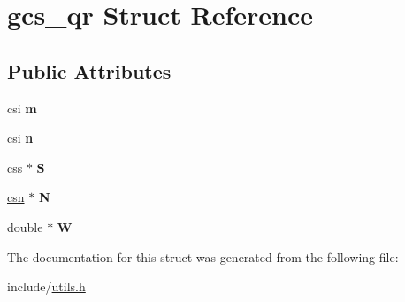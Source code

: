 \hypertarget{structgcs__qr}{\section{gcs\+\_\+qr Struct Reference}
\label{structgcs__qr}
}
\subsection*{Public Attributes}
\begin{DoxyCompactItemize}
\item 
\hypertarget{structgcs__qr_a0194509e3965e3c8d9653a9d801db79e}{csi {\bfseries m}}\label{structgcs__qr_a0194509e3965e3c8d9653a9d801db79e}

\item 
\hypertarget{structgcs__qr_a66b1d8d00721ed2760f8e69656ac1cbb}{csi {\bfseries n}}\label{structgcs__qr_a66b1d8d00721ed2760f8e69656ac1cbb}

\item 
\hypertarget{structgcs__qr_adb0fc2f2a9e0904ded44aa2e2510af18}{\hyperlink{structcs__symbolic}{css} $\ast$ {\bfseries S}}\label{structgcs__qr_adb0fc2f2a9e0904ded44aa2e2510af18}

\item 
\hypertarget{structgcs__qr_aa6321298eee9f1f6b10bf7c12a275004}{\hyperlink{structcs__numeric}{csn} $\ast$ {\bfseries N}}\label{structgcs__qr_aa6321298eee9f1f6b10bf7c12a275004}

\item 
\hypertarget{structgcs__qr_a3843fa874085938216d60b22a5d79cb4}{double $\ast$ {\bfseries W}}\label{structgcs__qr_a3843fa874085938216d60b22a5d79cb4}

\end{DoxyCompactItemize}


The documentation for this struct was generated from the following file\+:\begin{DoxyCompactItemize}
\item 
include/\hyperlink{utils_8h}{utils.\+h}\end{DoxyCompactItemize}

